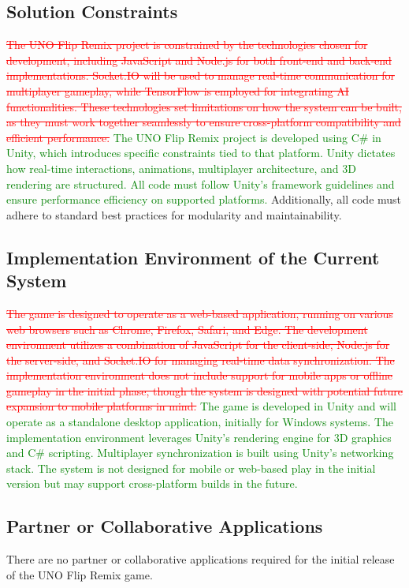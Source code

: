 \documentclass[12pt]{article}
\newcommand{\removed}[1]{\textcolor{red}{\sout{#1}}}
\newcommand{\added}[1]{\textcolor{green}{#1}}
\begin{document}
\subsection{Solution Constraints}
\removed{The UNO Flip Remix project is constrained by the technologies chosen for development, including JavaScript and Node.js for both front-end and back-end implementations. Socket.IO will be used to manage real-time communication for multiplayer gameplay, while TensorFlow is employed for integrating AI functionalities. These technologies set limitations on how the system can be built, as they must work together seamlessly to ensure cross-platform compatibility and efficient performance.} \added{The UNO Flip Remix project is developed using C\# in Unity, which introduces specific constraints tied to that platform. Unity dictates how real-time interactions, animations, multiplayer architecture, and 3D rendering are structured. All code must follow Unity’s framework guidelines and ensure performance efficiency on supported platforms.} Additionally, all code must adhere to standard best practices for modularity and maintainability.

\subsection{Implementation Environment of the Current System}
\removed{The game is designed to operate as a web-based application, running on various web browsers such as Chrome, Firefox, Safari, and Edge. The development environment utilizes a combination of JavaScript for the client-side, Node.js for the server-side, and Socket.IO for managing real-time data synchronization. The implementation environment does not include support for mobile apps or offline gameplay in the initial phase, though the system is designed with potential future expansion to mobile platforms in mind.} \added{The game is developed in Unity and will operate as a standalone desktop application, initially for Windows systems. The implementation environment leverages Unity’s rendering engine for 3D graphics and C\# scripting. Multiplayer synchronization is built using Unity’s networking stack. The system is not designed for mobile or web-based play in the initial version but may support cross-platform builds in the future.}

\subsection{Partner or Collaborative Applications}
There are no partner or collaborative applications required for the initial release of the UNO Flip Remix game.
\end{document}
